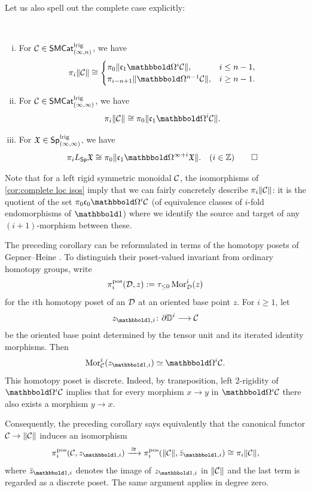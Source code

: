 \documentclass[a4paper,11pt]{article}
\begin{document}
Let us also spell out the complete case explicitly:
\begin{cornoproof}\label{cor:complete loc isos}\
  \begin{enumerate}[(i)]
  \item For $\mathcal{C} \in \textup{\textsf{SMCat}}_{(\infty,n)}^{\text{\textup{lrig}}}$, we have
    \[ \pi_{i} \Lgpd{\nC} \cong
      \begin{cases}
        \pi_{0} \Lgpd{\core \mOm^{i}\nC}, & i \leq n-1, \\
        \pi_{i-n+1} \Lgpd{\mOm^{n-1}\nC}, & i \geq n-1.
      \end{cases}
      \]
    \item For $\mathcal{C} \in \textup{\textsf{SMCat}}_{(\infty,\infty)}^{\text{\textup{lrig}}}$, we have
      \[ \pi_{i} \Lgpd{\nC} \cong \pi_{0} \Lgpd{\core \mOm^{i}\nC}.\]
  \item For $\mathfrak{X} \in \textup{\textsf{Sp}}_{(\infty,\infty)}^{\text{\textup{lrig}}}$, we have
    \[ \pi_{i} L_{\Sp}\spX \cong \pi_{0} \Lgpd{\core
        \mOm^{\infty+i}\spX}. \quad (i \in \mathbb{Z}) \qedhere\]
  \end{enumerate}
\end{cornoproof}

\begin{remark}
  Note that for a left rigid symmetric monoidal \iicat{} $\mathcal{C}$, the
  isomorphisms of \cref{cor:complete loc isos} imply that we can
  fairly concretely describe $\pi_{i} \|\mathcal{C}\|$: it is the quotient
  of the set $\pi_{0}\core[0] \mOm^{i}\nC$ (of equivalence classes of
  $i$-fold endomorphisms of $\bbone$) where we identify the source and
  target of any $(i+1)$-morphism between these.
\end{remark}


\begin{remark}\label{rmk:homotopy posets}
  The preceding corollary can be reformulated in terms of the
  homotopy posets of Gepner--Heine
  \cite[Definitions~4.1.1 and~4.2.4]{GepnerHeineHomotopy}. To
  distinguish their poset-valued invariant from ordinary homotopy
  groups, write
  \[
    \pi_i^{\mathrm{pos}}(\mathcal{D},z)
      := \tau_{\leq 0}\operatorname{Mor}_{\mathcal{D}}^{i}(z)
  \]
  for the $i$th homotopy poset of an \iicat{} $\mathcal{D}$ at an oriented
  base point $z$. For $i \geq 1$, let
  \[
    z_{\bbone,i} \colon \partial\mathbb{D}^{i} \longrightarrow \nC
  \]
  be the oriented base point determined by the tensor unit and its
  iterated identity morphisms. Then
  \[
    \operatorname{Mor}_{\nC}^{i}(z_{\bbone,i}) \simeq \mOm^{i}\nC.
  \]
  This homotopy poset is discrete. Indeed, by transposition, left
  $2$-rigidity of $\mOm^{i}\nC$ implies that for every morphism
  $x \to y$ in $\mOm^{i}\nC$ there also exists a morphism $y \to x$.

  Consequently, the preceding corollary says equivalently that the
  canonical functor $\nC \to \Lgpd{\nC}$ induces an isomorphism
  \[
    \pi_i^{\mathrm{pos}}(\nC,z_{\bbone,i})
      \xrightarrow{\;\cong\;}
    \pi_i^{\mathrm{pos}}(\Lgpd{\nC},\bar z_{\bbone,i})
      \cong \pi_i\Lgpd{\nC},
  \]
  where $\bar z_{\bbone,i}$ denotes the image of $z_{\bbone,i}$ in
  $\|\mathcal{C}\|$ and the last term is regarded as a discrete poset. The
  same argument applies in degree zero.
\end{remark}
\end{document}
